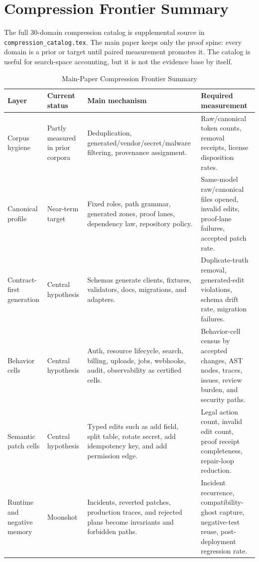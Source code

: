 \section{Compression Frontier Summary}
\label{sec:compression-frontier}

The full 30-domain compression catalog is supplemental source in \texttt{compression\_catalog.tex}. The main paper keeps only the proof spine: every domain is a prior or target until paired measurement promotes it. The catalog is useful for search-space accounting, but it is not the evidence base by itself.

\begin{table}[t]
\caption{Main-Paper Compression Frontier Summary}
\label{tab:frontier-summary}
\centering
\footnotesize
\begin{tabularx}{\textwidth}{p{}p{}X X}
\toprule
Layer & Current status & Main mechanism & Required measurement \\
\midrule
Corpus hygiene & Partly measured in prior corpora & Deduplication, generated/vendor/secret/malware filtering, provenance assignment. & Raw/canonical token counts, removal receipts, license disposition rates. \\
Canonical profile & Near-term target & Fixed roles, path grammar, generated zones, proof lanes, dependency law, repository policy. & Same-model raw/canonical files opened, invalid edits, proof-lane failures, accepted patch rate. \\
Contract-first generation & Central hypothesis & Schemas generate clients, fixtures, validators, docs, migrations, and adapters. & Duplicate-truth removal, generated-edit violations, schema drift rate, migration failures. \\
Behavior cells & Central hypothesis & Auth, resource lifecycle, search, billing, uploads, jobs, webhooks, audit, observability as certified cells. & Behavior-cell census by accepted changes, AST nodes, traces, issues, review burden, and security paths. \\
Semantic patch cells & Central hypothesis & Typed edits such as add field, split table, rotate secret, add idempotency key, and add permission edge. & Legal action count, invalid edit count, proof receipt completeness, repair-loop reduction. \\
Runtime and negative memory & Moonshot & Incidents, reverted patches, production traces, and rejected plans become invariants and forbidden paths. & Incident recurrence, compatibility-ghost capture, negative-test reuse, post-deployment regression rate. \\
\bottomrule
\end{tabularx}
\end{table}

